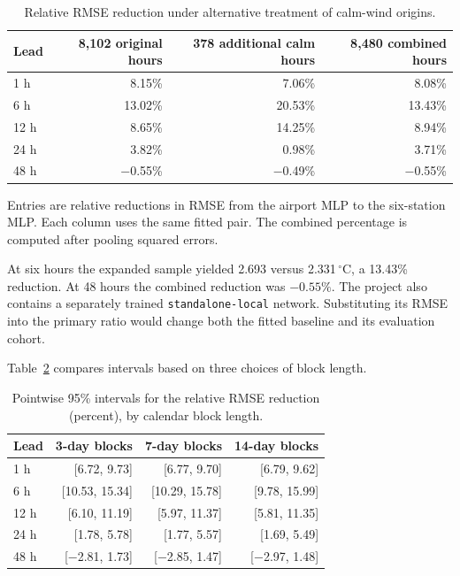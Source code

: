 \documentclass[11pt,letterpaper]{article}
\newcommand{\thead}[1]{\textbf{#1}}\newcommand{\bestscore}[1]{\textbf{#1}}
\newcommand{\celsius}{\ensuremath{^{\circ}\mathrm{C}}}\newcommand{\code}[1]{\texttt{\small #1}}
\begin{document}
\begin{table}[!htbp]
\centering\small
\caption{Relative RMSE reduction under alternative treatment of calm-wind origins.}\label{tab:calm}
\renewcommand{\arraystretch}{1.12}\begin{tabular*}{.95\linewidth}{@{\extracolsep{\fill}}lrrr@{}}\toprule\thead{Lead}&\thead{8,102 original hours}&\thead{378 additional calm hours}&\thead{8,480 combined hours}\\\midrule
1 h & 8.15\% & 7.06\% & 8.08\% \\
6 h & 13.02\% & 20.53\% & 13.43\% \\
12 h & 8.65\% & 14.25\% & 8.94\% \\
24 h & 3.82\% & 0.98\% & 3.71\% \\
48 h & −0.55\% & −0.49\% & −0.55\% \\
\bottomrule\end{tabular*}
\end{table}


Entries are relative reductions in RMSE from the airport MLP to the six-station MLP. Each column uses the same fitted pair. The combined percentage is computed after pooling squared errors.

At six hours the expanded sample yielded 2.693 versus 2.331\,\celsius{}, a 13.43\% reduction. At 48 hours the combined reduction was $-0.55\%$. The project also contains a separately trained \code{standalone-local} network. Substituting its RMSE into the primary ratio would change both the fitted baseline and its evaluation cohort.


Table~\ref{tab:blocks} compares intervals based on three choices of block length.



\begin{table}[!htbp]
\centering\small
\caption{Pointwise 95\% intervals for the relative RMSE reduction (percent), by calendar block length.}\label{tab:blocks}
\renewcommand{\arraystretch}{1.14}\begin{tabular*}{.95\linewidth}{@{\extracolsep{\fill}}lrrr@{}}\toprule\thead{Lead}&\thead{3-day blocks}&\thead{7-day blocks}&\thead{14-day blocks}\\\midrule
1 h & [6.72, 9.73] & [6.77, 9.70] & [6.79, 9.62] \\
6 h & [10.53, 15.34] & [10.29, 15.78] & [9.78, 15.99] \\
12 h & [6.10, 11.19] & [5.97, 11.37] & [5.81, 11.35] \\
24 h & [1.78, 5.78] & [1.77, 5.57] & [1.69, 5.49] \\
48 h & [−2.81, 1.73] & [−2.85, 1.47] & [−2.97, 1.48] \\
\bottomrule\end{tabular*}
\end{table}
\end{document}
